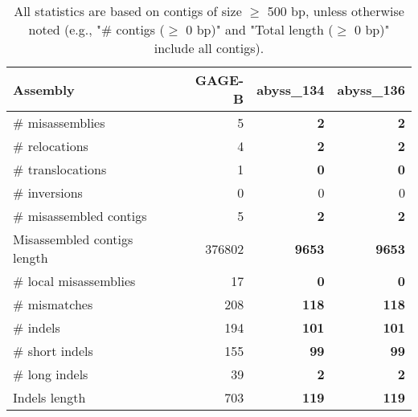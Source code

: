 \documentclass[12pt,a4paper]{article}
\begin{document}
\begin{table}[ht]
\begin{center}
\caption{All statistics are based on contigs of size $\geq$ 500 bp, unless otherwise noted (e.g., "\# contigs ($\geq$ 0 bp)" and "Total length ($\geq$ 0 bp)" include all contigs).}
\begin{tabular}{|l*{3}{|r}|}
\hline
Assembly & GAGE-B & abyss\_134 & abyss\_136 \\ \hline
\# misassemblies & 5 & {\bf 2} & {\bf 2} \\ \hline
\hspace{5mm}\# relocations & 4 & {\bf 2} & {\bf 2} \\ \hline
\hspace{5mm}\# translocations & 1 & {\bf 0} & {\bf 0} \\ \hline
\hspace{5mm}\# inversions & 0 & 0 & 0 \\ \hline
\# misassembled contigs & 5 & {\bf 2} & {\bf 2} \\ \hline
Misassembled contigs length & 376802 & {\bf 9653} & {\bf 9653} \\ \hline
\# local misassemblies & 17 & {\bf 0} & {\bf 0} \\ \hline
\# mismatches & 208 & {\bf 118} & {\bf 118} \\ \hline
\# indels & 194 & {\bf 101} & {\bf 101} \\ \hline
\hspace{5mm}\# short indels & 155 & {\bf 99} & {\bf 99} \\ \hline
\hspace{5mm}\# long indels & 39 & {\bf 2} & {\bf 2} \\ \hline
Indels length & 703 & {\bf 119} & {\bf 119} \\ \hline
\end{tabular}
\end{center}
\end{table}
\end{document}
